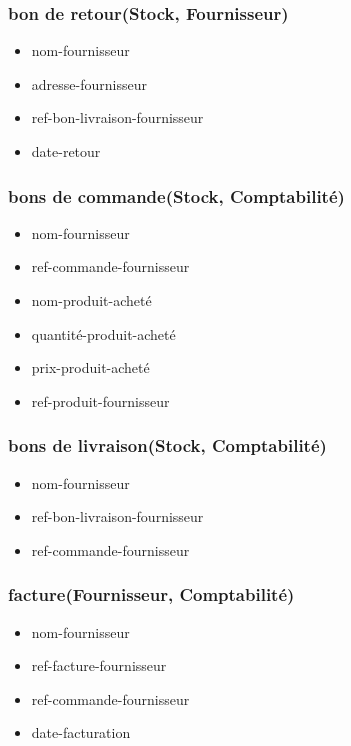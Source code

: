 \subsubsection*{bon de retour(Stock, Fournisseur)}
\begin{itemize}
    \item nom-fournisseur
    \item adresse-fournisseur
    \item ref-bon-livraison-fournisseur
    \item date-retour
\end{itemize}

\subsubsection*{bons de commande(Stock, Comptabilité)}
\begin{itemize}
    \item nom-fournisseur
    \item ref-commande-fournisseur
    \item nom-produit-acheté
    \item quantité-produit-acheté
    \item prix-produit-acheté
    \item ref-produit-fournisseur
\end{itemize}

\subsubsection*{bons de livraison(Stock, Comptabilité)}
\begin{itemize}
    \item nom-fournisseur
    \item ref-bon-livraison-fournisseur
    \item ref-commande-fournisseur
\end{itemize}

\subsubsection*{facture(Fournisseur, Comptabilité)}
\begin{itemize}
    \item nom-fournisseur
    \item ref-facture-fournisseur
    \item ref-commande-fournisseur
    \item date-facturation
\end{itemize}

